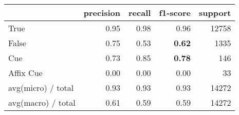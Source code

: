 \begin{tabular}{lrrrr}
    \toprule
    {} &      precision &  recall &  f1-score & support \\
    \midrule
    True &         0.95 &    0.98 &      0.96 &   12758 \\
    False &        0.75 &    0.53 &      \textbf{0.62} &    1335 \\
    Cue &          0.73 &    0.85 &      \textbf{0.78} &     146 \\
    Affix Cue &    0.00 &    0.00 &      0.00 &      33 \\
    \bottomrule
    avg(micro) / total &  0.93 &    0.93 &      0.93 & 14272 \\
    avg(macro) / total &  0.61 &    0.59 &      0.59 & 14272 \\  
    \end{tabular}
    